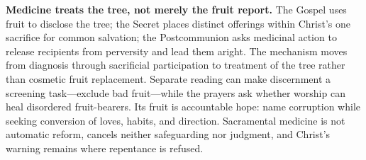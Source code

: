 \noindent\textbf{Medicine treats the tree, not merely the fruit report.\enspace{}}
The Gospel uses fruit to disclose the tree; the Secret places distinct offerings within Christ's one sacrifice for common salvation; the Postcommunion asks medicinal action to release recipients from perversity and lead them aright. The mechanism moves from diagnosis through sacrificial participation to treatment of the tree rather than cosmetic fruit replacement. Separate reading can make discernment a screening task---exclude bad fruit---while the prayers ask whether worship can heal disordered fruit-bearers. Its fruit is accountable hope: name corruption while seeking conversion of loves, habits, and direction. Sacramental medicine is not automatic reform, cancels neither safeguarding nor judgment, and Christ's warning remains where repentance is refused.
